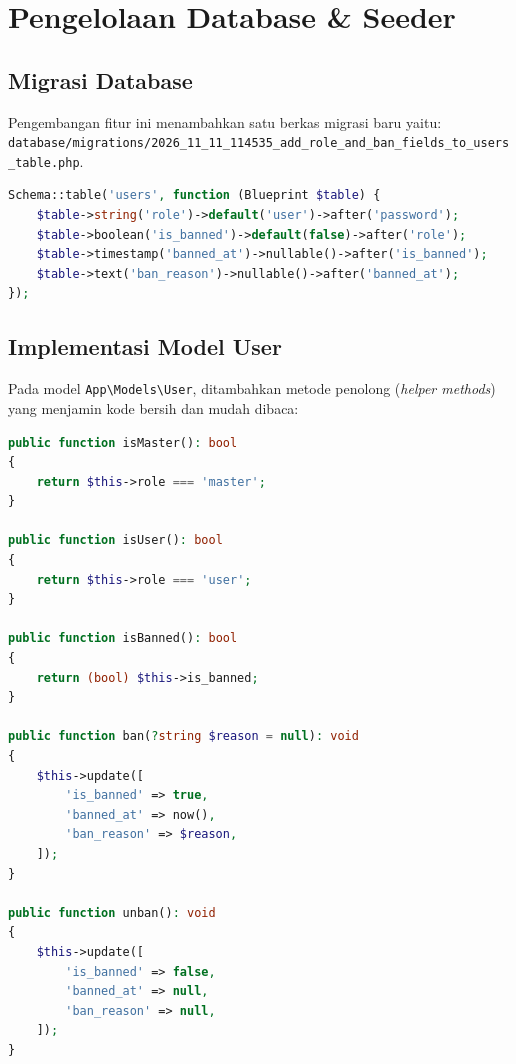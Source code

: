 \documentclass[12pt,a4paper]{article}
\begin{document}
\newpage

\section{Pengelolaan Database \& Seeder}

\subsection{Migrasi Database}
Pengembangan fitur ini menambahkan satu berkas migrasi baru yaitu:
\texttt{database/migrations/2026\_11\_11\_114535\_add\_role\_and\_ban\_fields\_to\_users\_table.php}.

\begin{lstlisting}[language=PHP, caption={Cuplikan Skema Migrasi Penambahan Kolom Role dan Ban}]
Schema::table('users', function (Blueprint $table) {
    $table->string('role')->default('user')->after('password');
    $table->boolean('is_banned')->default(false)->after('role');
    $table->timestamp('banned_at')->nullable()->after('is_banned');
    $table->text('ban_reason')->nullable()->after('banned_at');
});
\end{lstlisting}

\subsection{Implementasi Model User}
Pada model \texttt{App\textbackslash Models\textbackslash User}, ditambahkan metode penolong (\textit{helper methods}) yang menjamin kode bersih dan mudah dibaca:
\begin{lstlisting}[language=PHP, caption={Metode Helper pada Model User}]
public function isMaster(): bool
{
    return $this->role === 'master';
}

public function isUser(): bool
{
    return $this->role === 'user';
}

public function isBanned(): bool
{
    return (bool) $this->is_banned;
}

public function ban(?string $reason = null): void
{
    $this->update([
        'is_banned' => true,
        'banned_at' => now(),
        'ban_reason' => $reason,
    ]);
}

public function unban(): void
{
    $this->update([
        'is_banned' => false,
        'banned_at' => null,
        'ban_reason' => null,
    ]);
}
\end{lstlisting}
\end{document}
